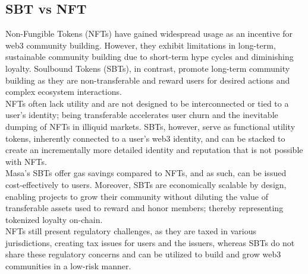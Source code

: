 \documentclass{article}
\begin{document}
\subsection{SBT vs NFT}
Non-Fungible Tokens (NFTs) have gained widespread usage as an incentive for web3 community building. However, they exhibit limitations in long-term, sustainable community building due to short-term hype cycles and diminishing loyalty. Soulbound Tokens (SBTs), in contrast, promote long-term community building as they are non-transferable and reward users for desired actions and complex ecosystem interactions. 
\\
\newline
NFTs often lack utility and are not designed to be interconnected or tied to a user's identity; being transferable accelerates user churn and the inevitable dumping of NFTs in illiquid markets. SBTs, however, serve as functional utility tokens, inherently connected to a user's web3 identity, and can be stacked to create an incrementally more detailed identity and reputation that is not possible with NFTs. 
\\
\newline
Masa’s SBTs offer gas savings compared to NFTs, and as such, can be issued cost-effectively to users. Moreover, SBTs are economically scalable by design, enabling projects to grow their community without diluting the value of transferable assets used to reward and honor members; thereby representing tokenized loyalty on-chain.
\\
\newline
NFTs still present regulatory challenges, as they are taxed in various jurisdictions, creating tax issues for users and the issuers, whereas SBTs do not share these regulatory concerns and can be utilized to build and grow web3 communities in a low-risk manner.
\end{document}
